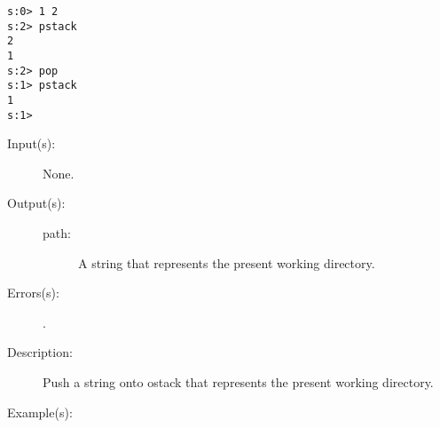 \begin{description}
\begin{description}
\begin{verbatim}
s:0> 1 2
s:2> pstack
2
1
s:2> pop
s:1> pstack
1
s:1>
		\end{verbatim}
	\end{description}
\label{systemdict:pwd}
\item[{\onyxop{--}{pwd}{path}}: ]
	\begin{description}\item[]
	\item[Input(s): ] None.
	\item[Output(s): ]
		\begin{description}\item[]
		\item[path: ]
			A string that represents the present working directory.
		\end{description}
	\item[Errors(s): ]
		\begin{description}\item[]
		\item[.]
		\end{description}
	\item[Description: ]
		Push a string onto ostack that represents the present working
		directory.
	\item[Example(s): ]\begin{verbatim}


\end{verbatim}
\end{description}
\end{description}
